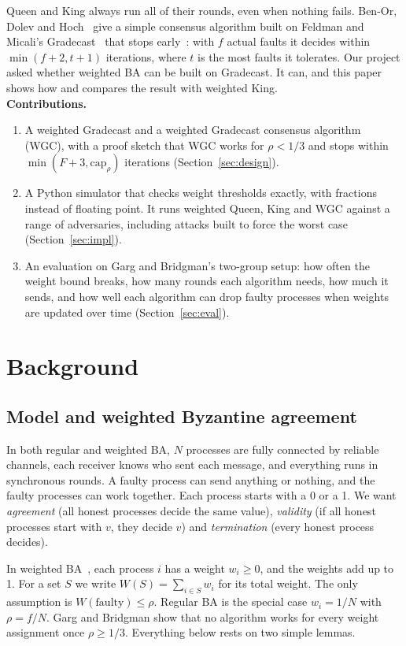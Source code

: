 \documentclass[conference]{IEEEtran}
\theoremstyle{definition}
\newcommand{\W}{W}
\newcommand{\capr}{\mathrm{cap}_\rho}
\begin{document}
Queen and King always run all of their rounds, even when nothing fails. Ben-Or, Dolev and Hoch~\cite{benor2010} give a simple consensus algorithm built on Feldman and Micali's Gradecast~\cite{feldman1997} that stops early~\cite{dolev1990}: with $f$ actual faults it decides within $\min(f+2,t+1)$ iterations, where $t$ is the most faults it tolerates. Our project asked whether weighted BA can be built on Gradecast. It can, and this paper shows how and compares the result with weighted King.\\ \textbf{Contributions.}
\begin{enumerate}
\item[(1)] A weighted Gradecast and a weighted Gradecast consensus algorithm (WGC), with a proof sketch that WGC works for $\rho<1/3$ and stops within $\min(F+3,\capr)$ iterations (Section~\ref{sec:design}).
\item[(2)] A Python simulator that checks weight thresholds exactly, with fractions instead of floating point. It runs weighted Queen, King and WGC against a range of adversaries, including attacks built to force the worst case (Section~\ref{sec:impl}).
\item[(3)] An evaluation on Garg and Bridgman's two-group setup: how often the weight bound breaks, how many rounds each algorithm needs, how much it sends, and how well each algorithm can drop faulty processes when weights are updated over time (Section~\ref{sec:eval}).
\end{enumerate}

\section{Background}\label{sec:background}

\subsection{Model and weighted Byzantine agreement}
In both regular and weighted BA, $N$ processes are fully connected by reliable channels, each receiver knows who sent each message, and everything runs in synchronous rounds. A faulty process can send anything or nothing, and the faulty processes can work together. Each process starts with a 0 or a 1. We want \emph{agreement} (all honest processes decide the same value), \emph{validity} (if all honest processes start with $v$, they decide $v$) and \emph{termination} (every honest process decides).

In weighted BA~\cite{garg2011}, each process $i$ has a weight $w_i\ge 0$, and the weights add up to 1. For a set $S$ we write $\W(S)=\sum_{i\in S}w_i$ for its total weight. The only assumption is $\W(\text{faulty})\le\rho$. Regular BA is the special case $w_i=1/N$ with $\rho=f/N$. Garg and Bridgman show that no algorithm works for every weight assignment once $\rho\ge 1/3$. Everything below rests on two simple lemmas.
\end{document}
